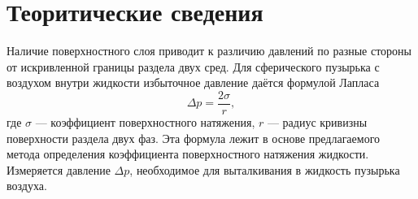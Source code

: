 \section{Теоритические сведения}

Наличие поверхностного слоя приводит к различию давлений по разные стороны от искривленной границы раздела двух сред.  Для сферического пузырька с воздухом  внутри жидкости избыточное давление даётся формулой Лапласа
\[\Delta p = \frac{2\sigma}{r},\]
где $\sigma$ --- коэффициент поверхностного натяжения, $r$ --- радиус кривизны поверхности раздела двух фаз.
Эта формула лежит в основе предлагаемого метода определения коэффициента поверхностного натяжения жидкости. Измеряется давление
$\Delta p$, необходимое для выталкивания в жидкость пузырька воздуха.
